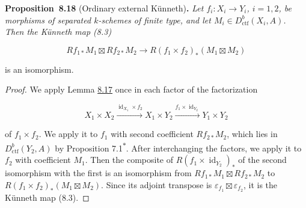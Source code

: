 \documentclass[11pt]{article}
\newenvironment{bpstatement}[2]{\par\addvspace{0.6\baselineskip}\noindent\textbf{#1}#2\textbf{.}\enspace\ignorespaces}
  {\par\addvspace{0.4\baselineskip}}
\newenvironment{bpstatementit}[2]{\begin{bpstatement}{#1}{#2}\itshape\ignorespaces}{\end{bpstatement}}
\newcommand{\bpout}[1]{#1\textsuperscript{\hyperlink{bp-outside}{\ensuremath{\ast}}}}
\begin{document}
\label{bp64}%
\begin{bpstatementit}{Proposition~8.18}{ (Ordinary external Künneth)}
Let \(f_i:X_i\to Y_i\), \(i=1,2\), be morphisms of separated \(k\)-schemes of finite type, and let \(M_i\in D^b_{\mathrm{ctf}}(X_i,A)\). Then the Künneth map (8.3)

\[
Rf_{1*}M_1\boxtimes Rf_{2*}M_2
\longrightarrow R(f_1\times f_2)_*(M_1\boxtimes M_2)
\]

is an isomorphism.
\end{bpstatementit}

\begin{proof}[{Proof}]\label{bp65}%
We apply Lemma \hyperref[bp62]{8.17} once in each factor of the factorization

\[
X_1\times X_2\xrightarrow{\operatorname{id}_{X_1}\times f_2}
X_1\times Y_2\xrightarrow{f_1\times\operatorname{id}_{Y_2}}
Y_1\times Y_2
\]

of \(f_1\times f_2\). We apply it to \(f_1\) with second coefficient \(Rf_{2*}M_2\), which lies in \(D^b_{\mathrm{ctf}}(Y_2,A)\) by Proposition \bpout{7.1}. After interchanging the factors, we apply it to \(f_2\) with coefficient \(M_1\). Then the composite of \(R(f_1\times\operatorname{id}_{Y_2})_*\) of the second isomorphism with the first is an isomorphism from \(Rf_{1*}M_1\boxtimes Rf_{2*}M_2\) to \(R(f_1\times f_2)_*(M_1\boxtimes M_2)\). Since its adjoint transpose is \(\varepsilon_{f_1}\boxtimes\varepsilon_{f_2}\), it is the Künneth map (8.3).
\end{proof}



\clearpage{}\hypertarget{bp-outside}{}%
\end{document}
